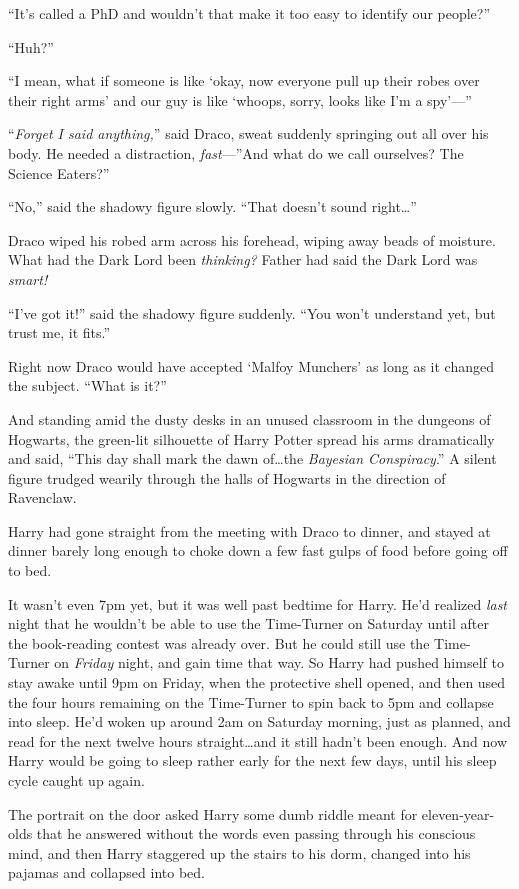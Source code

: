 “It’s called a PhD and wouldn’t that make it too easy to identify our people?”

“Huh?”

“I mean, what if someone is like ‘okay, now everyone pull up their robes over
their right arms’ and our guy is like ‘whoops, sorry, looks like I’m a spy’—”

“\emph{Forget I said anything,}” said Draco, sweat suddenly springing out all
over his body. He needed a distraction, \emph{fast}—”And what do we call
ourselves? The Science Eaters?”

“No,” said the shadowy figure slowly. “That doesn’t sound right…”

Draco wiped his robed arm across his forehead, wiping away beads of moisture.
What had the Dark Lord been \emph{thinking?} Father had said the Dark Lord was
\emph{smart!}

“I’ve got it!” said the shadowy figure suddenly. “You won’t understand yet, but
trust me, it fits.”

Right now Draco would have accepted ‘Malfoy Munchers’ as long as it changed the
subject. “What is it?”

And standing amid the dusty desks in an unused classroom in the dungeons of
Hogwarts, the green-lit silhouette of Harry Potter spread his arms dramatically
and said, “This day shall mark the dawn of…the \emph{Bayesian
Conspiracy}.”
\later
A silent figure trudged wearily through the halls of Hogwarts in the direction
of Ravenclaw.

Harry had gone straight from the meeting with Draco to dinner, and stayed at
dinner barely long enough to choke down a few fast gulps of food before going
off to bed.

It wasn’t even 7pm yet, but it was well past bedtime for Harry. He’d realized
\emph{last} night that he wouldn’t be able to use the Time-Turner on Saturday
until after the book-reading contest was already over. But he could still use
the Time-Turner on \emph{Friday} night, and gain time that way. So Harry had
pushed himself to stay awake until 9pm on Friday, when the protective shell
opened, and then used the four hours remaining on the Time-Turner to spin back
to 5pm and collapse into sleep. He’d woken up around 2am on Saturday morning,
just as planned, and read for the next twelve hours straight…and it
still hadn’t been enough. And now Harry would be going to sleep rather early
for the next few days, until his sleep cycle caught up again.

The portrait on the door asked Harry some dumb riddle meant for
eleven-year-olds that he answered without the words even passing through his
conscious mind, and then Harry staggered up the stairs to his dorm,
changed into his pajamas and collapsed into bed.


